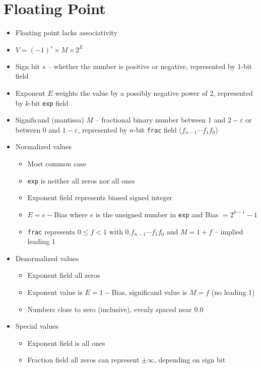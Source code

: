 \documentclass[twocolumn]{article}
\renewcommand{\tt}[1]{\texttt{#1}}
\begin{document}
\vfill
\pagebreak

\section{Floating Point}
\begin{itemize}[noitemsep]
    \item Floating point lacks associativity
    \item $V = (-1)^s \times M \times 2^E$
    \item Sign bit $s$ -- whether the number is positive or negative, represented by 1-bit field
    \item Exponent $E$ weights the value by a possibly negative power of 2, represented by $k$-bit \tt{exp} field
    \item Significand (mantissa) $M$ -- fractional binary number between 1 and $2 - \varepsilon$ or between 0 and $1 - \varepsilon$, represented by $n$-bit \tt{frac} field ($f_{n - 1}\cdots f_1 f_0$)
    \item Normalized values
    \begin{itemize}[noitemsep]
        \item Most common case
        \item \tt{exp} is neither all zeros nor all ones
        \item Exponent field represents biased signed integer
        \item $E = e - $Bias where $e$ is the unsigned number in \tt{exp} and Bias $= 2^{k - 1} - 1$
        \item \tt{frac} represents $0 \leq f < 1$ with $0.f_{n - 1}\cdots f_1 f_0$ and $M = 1 + f$ -- implied leading 1
    \end{itemize}
    \item Denormalized values
    \begin{itemize}[noitemsep]
        \item Exponent field all zeros
        \item Exponent value is $E = 1 - $Bias, significand value is $M = f$ (no leading 1)
        \item Numbers close to zero (inclusive), evenly spaced near 0.0
    \end{itemize}
    \item Special values
    \begin{itemize}[noitemsep]
        \item Exponent field is all ones
        \item Fraction field all zeros can represent $\pm \infty$, depending on sign bit

\end{itemize}
\end{itemize}
\end{document}

